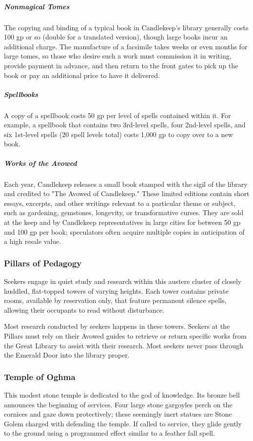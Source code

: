 \documentclass[10pt,a4paper,twoside,bg=print,twocolumn,openany,nodeprecatedcode]{dndbook}
\begin{document}
\subparagraph{Nonmagical Tomes}
The copying and binding of a typical book in Candlekeep's library generally costs 100 gp or so (double for a translated version), though large books incur an additional charge. The manufacture of a facsimile takes weeks or even months for large tomes, so those who desire such a work must commission it in writing, provide payment in advance, and then return to the front gates to pick up the book or pay an additional price to have it delivered.

\subparagraph{Spellbooks}
A copy of a spellbook costs 50 gp per level of spells contained within it. For example, a spellbook that contains two 3rd-level spells, four 2nd-level spells, and six 1st-level spells (20 spell levels total) costs 1,000 gp to copy over to a new book.

\subparagraph{Works of the Avowed}
Each year, Candlekeep releases a small book stamped with the sigil of the library and credited to "The Avowed of Candlekeep." These limited editions contain short essays, excerpts, and other writings relevant to a particular theme or subject, such as gardening, gemstones, longevity, or transformative curses. They are sold at the keep and by Candlekeep representatives in large cities for between 50 gp and 100 gp per book; speculators often acquire multiple copies in anticipation of a high resale value.

\subsubsection{Pillars of Pedagogy}
Seekers engage in quiet study and research within this austere cluster of closely huddled, flat-topped towers of varying heights. Each tower contains private rooms, available by reservation only, that feature permanent silence spells, allowing their occupants to read without disturbance.

Most research conducted by seekers happens in these towers. Seekers at the Pillars must rely on their Avowed guides to retrieve or return specific works from the Great Library to assist with their research. Most seekers never pass through the Emerald Door into the library proper.

\subsubsection{Temple of Oghma}
This modest stone temple is dedicated to the god of knowledge. Its bronze bell announces the beginning of services. Four large stone gargoyles perch on the cornices and gaze down protectively; these seemingly inert statues are Stone Golem charged with defending the temple. If called to service, they glide gently to the ground using a programmed effect similar to a feather fall spell.
\end{document}

